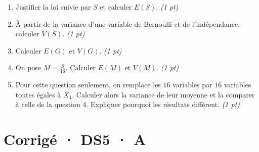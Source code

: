 \begin{enumerate}

\item Justifier la loi suivie par $S$ et calculer $E(S)$. \hfill\textit{(1 pt)}

\item À partir de la variance d'une variable de Bernoulli et de l'indépendance, calculer $V(S)$. \hfill\textit{(1 pt)}

\item Calculer $E(G)$ et $V(G)$. \hfill\textit{(1 pt)}

\item On pose $M=\frac S{16}$. Calculer $E(M)$ et $V(M)$. \hfill\textit{(1 pt)}

\item Pour cette question seulement, on remplace les $16$ variables par $16$ variables toutes égales à $X_1$. Calculer alors la variance de leur moyenne et la comparer à celle de la question 4. Expliquer pourquoi les résultats diffèrent. \hfill\textit{(1 pt)}

\end{enumerate}

\ifmxteacher\mxnewpage

\section*{Corrigé · DS5 · A}\label{cor:7-3}

